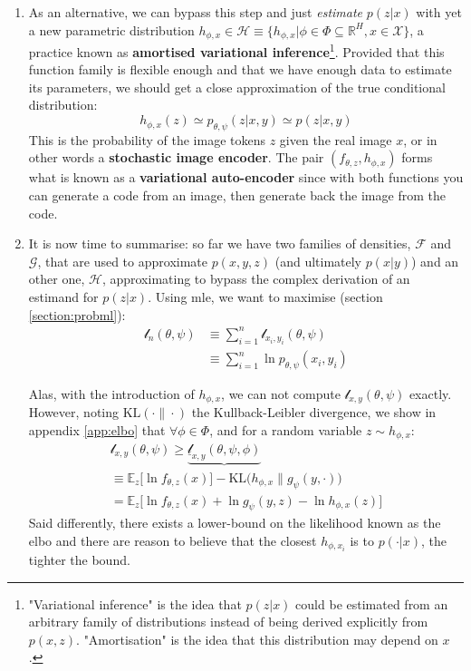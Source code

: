 \documentclass{article}
\begin{document}
\begin{multicols}{2}
\begin{enumerate}
    \item As an alternative, we can bypass this step and just \textit{estimate} $p(z|x)$ with yet a new parametric distribution $h_{\phi,x}\in \mathcal{H}\equiv \{h_{\phi,x}|\phi\in\Phi\subseteq\mathbb{R}^{H},x\in\mathcal{X}\}$, a practice known as \textbf{amortised variational inference}\footnote{"Variational inference" is the idea that $p(z|x)$ could be estimated from an arbitrary family of distributions instead of being derived explicitly from $p(x,z)$. "Amortisation" is the idea that this distribution may depend on $x$.}. Provided that this function family is flexible enough and that we have enough data to estimate its parameters, we should get a close approximation of the true conditional distribution:
    $$h_{\phi,x}(z)\simeq p_{\theta,\psi}(z|x,y)\simeq p(z|x,y)$$
    This is the probability of the image tokens $z$ given the real image $x$, or in other words a \textbf{stochastic image encoder}. The pair $(f_{\theta,z}, h_{\phi,x})$ forms what is known as a \textbf{variational auto-encoder} since with both functions you can generate a code from an image, then generate back the image from the code.
    
    \item It is now time to summarise: so far we have two families of densities, $\mathcal{F}$ and $\mathcal{G}$, that are used to approximate $p(x,y,z)$ (and ultimately $p(x|y)$) and an other one, $\mathcal{H}$, approximating to bypass the complex derivation of an estimand for $p(z|x)$. Using \gls{mle}, we want to maximise (section \ref{section:probml}): \begin{align*}\mathscr{l}_n(\theta,\psi) & \equiv \sum_{i=1}^n \mathscr{l}_{x_i,y_i}(\theta,\psi) \\ & \equiv \sum_{i=1}^n \ln p_{\theta,\psi}(x_i,y_i)\end{align*}
    
    Alas, with the introduction of $h_{\phi,x}$, we can not compute $\mathscr{l}_{x,y}(\theta,\psi)$ exactly. However, noting $\textrm{KL}(\cdot \| \cdot )$ the Kullback-Leibler divergence, we show in appendix \ref{app:elbo} that $\forall \phi \in \Phi$, and for a random variable $z\sim h_{\phi,x}$:
    \begin{align} \label{eq:elb_ours}
    \mathscr{l}_{x,y}(\theta,\psi) \geqslant \underbrace{\underline{\mathscr{l}}_{x,y}(\theta,\psi,\phi)}{} \\ \equiv \mathbb{E}_z \Big[\ln f_{\theta,z}(x)\Big] - \textrm{KL}\Big( h_{\phi,x} \| g_\psi(y,\cdot) \Big) \\ =\mathbb{E}_z \Big[\ln f_{\theta,z}(x)+\ln g_\psi(y,z) -\ln h_{\phi,x}(z)\Big]
    \end{align}
    Said differently, there exists a lower-bound on the likelihood known as the \gls{elbo} and there are reason to believe that the closest $h_{\phi,x_i}$ is to $p(\cdot|x)$, the tighter the bound. %
    

\end{enumerate}
\end{multicols}
\end{document}
